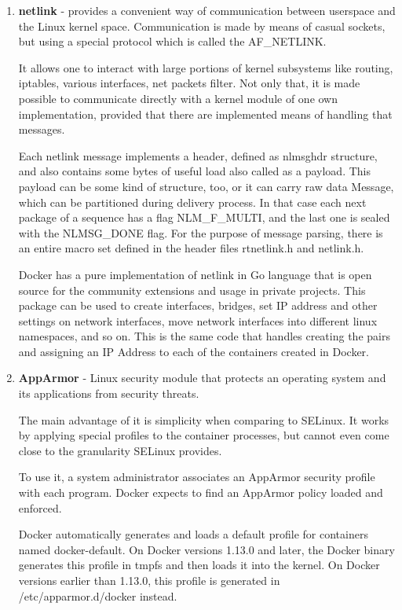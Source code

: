 \begin{enumerate}
\item \textbf{netlink} - provides a convenient way of communication
between userspace and the Linux kernel space.
Communication is made by means of casual sockets,
but using a special protocol which is called the AF\_NETLINK\cite{NetlinkOverview}.

It allows one to interact with large portions of kernel subsystems
like routing, iptables, various interfaces, net packets filter.
Not only that, it is made possible to communicate directly with a kernel
module of one own implementation, provided that
there are implemented means of handling that messages.

Each netlink message implements a header,
defined as nlmsghdr structure,
and also contains some bytes of useful load also called as a payload.
This payload can be some kind of structure, too, or it can carry raw data
Message, which can be partitioned during delivery process.
In that case each next package of a sequence has a flag NLM\_F\_MULTI,
and the last one is sealed with the NLMSG\_DONE flag.
For the purpose of message parsing, there is an entire macro set
defined in the header files rtnetlink.h and netlink.h\cite{NetlinkPacket}.

Docker has a pure implementation of netlink
in Go language that is open source for the community extensions
and usage in private projects.
This package can be used to create interfaces,
bridges, set IP address and other settings on network interfaces,
move network interfaces into different linux namespaces,
and so on.
This is the same code that handles creating the pairs and assigning
an IP Address to each of the containers created in Docker.

\item \textbf{AppArmor} - Linux security module
that protects an operating system and its applications from security threats.

The main advantage of it is simplicity when comparing to SELinux.
It works by applying special profiles to the container processes,
but cannot even come close
to the granularity SELinux provides\cite{AdrMouAppArmor:2016}.

To use it, a system administrator associates an
AppArmor security profile with each program.
Docker expects to find an AppArmor policy loaded and enforced.

Docker automatically generates and loads a default profile for containers
named docker-default. On Docker versions 1.13.0 and later, the Docker
binary generates this profile in tmpfs and then loads it into the kernel.
On Docker versions earlier than 1.13.0, this
profile is generated in /etc/apparmor.d/docker instead.


\end{enumerate}
